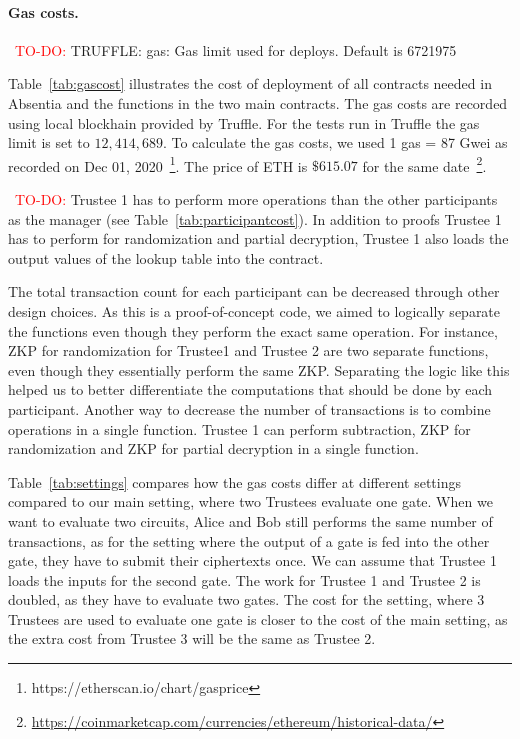 
 





\paragraph{Gas costs.} 

~\textcolor{red}{TO-DO:} TRUFFLE: gas: Gas limit used for deploys. Default is 6721975

Table~\ref{tab:gascost} illustrates the cost of deployment of all contracts needed in Absentia and the functions in the two main contracts. The gas costs are recorded using local blockhain provided by Truffle. For the tests run in Truffle the gas limit is set to $12,414,689$. To calculate the gas costs, we used 1 gas = 87 Gwei as recorded on Dec 01, 2020~\footnote{https://etherscan.io/chart/gasprice}. The price of ETH is $\$615.07$ for the same date~\footnote{\url{https://coinmarketcap.com/currencies/ethereum/historical-data/}}. %

~\textcolor{red}{TO-DO:} Trustee 1 has to perform more operations than the other participants as the manager (see Table~\ref{tab:participantcost}). In addition to proofs Trustee 1 has to perform for randomization and partial decryption, Trustee 1 also loads the output values of the lookup table into the contract. 

The total transaction count for each participant can be decreased through other design choices. As this is a proof-of-concept code, we aimed to logically separate the functions even though they perform the exact same operation. For instance, ZKP for randomization for Trustee1 and Trustee 2 are two separate functions, even though they essentially perform the same ZKP. Separating the logic like this helped us to better differentiate the computations that should be done by each participant. Another way to decrease the number of transactions is to combine operations in a single function. Trustee 1 can perform subtraction, ZKP for randomization and ZKP for partial decryption in a single function.

Table~\ref{tab:settings} compares how the gas costs differ at different settings compared to our main setting, where two Trustees evaluate one gate. When we want to evaluate two circuits, Alice and Bob still performs the same number of transactions, as for the setting where the output of a gate is fed into the other gate, they have to submit their ciphertexts once. We can assume that Trustee 1 loads the inputs for the second gate. The work for Trustee 1 and Trustee 2 is doubled, as they have to evaluate two gates. The cost for the setting, where 3 Trustees are used to evaluate one gate is closer to the cost of the main setting, as the extra cost from Trustee 3 will be the same as Trustee 2.


